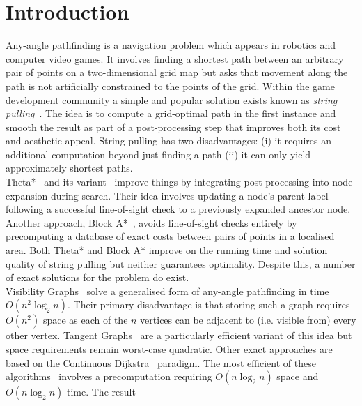 \section{Introduction}
\label{cha::anya::intro}
Any-angle pathfinding is a navigation problem which appears in robotics
and computer video games. It involves finding a shortest path between an 
arbitrary pair of points on a two-dimensional grid map but asks that 
movement along the path is not artificially constrained to the points of 
the grid.  Within the game development community a simple and popular 
solution exists known as \emph{string pulling}~\citep{pinter01,botea04}.
The idea is to compute a grid-optimal path in the first
instance and smooth the result as part of a post-processing step that improves
both its cost and aesthetic appeal. String pulling has two disadvantages: 
(i) it requires an additional computation beyond just finding a path (ii)
it can only yield approximately shortest paths.
\\
Theta*~\citep{nash07} and its variant~\citep{%
nash10} improve things 
by integrating post-processing into node expansion during search. Their 
idea involves updating a node's parent label following a successful line-of-sight
check to a previously expanded ancestor node.
Another approach, Block A*~\citep{yap11}, avoids line-of-sight checks entirely 
by precomputing a database of exact costs between pairs of points in a localised area.
Both Theta* and Block A* improve on the running time and 
solution quality of string pulling but neither guarantees optimality.
Despite this, a number of exact solutions for the problem do exist.
\\
Visibility Graphs~\citep{lozanoperez79} solve a generalised form of 
any-angle pathfinding in time $O(n^2\log_{2}n)$. Their primary disadvantage
is that storing such a graph requires $O(n^2)$ space as each of the $n$ 
vertices can be adjacent to (i.e. visible from) every other vertex.  
Tangent Graphs~\citep{liu92} are a particularly efficient 
variant of this idea but space requirements remain worst-case quadratic. 
Other exact approaches are based on the 
Continuous Dijkstra~\citep{mitchell87} paradigm.
The most efficient of these algorithms~\citep{hershberger99} involves a
precomputation requiring $O(n \log_{2}{n})$ space and $O(n\log_{2}n)$ time.  The result 
